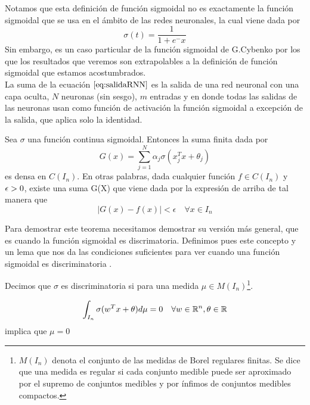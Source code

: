     \noindent Notamos que esta definición de función sigmoidal no es exactamente la función sigmoidal que se usa en el ámbito de las redes neuronales, la cual viene dada por
    \begin{equation}\label{eq:sigmoide}
        \sigma(t) = \frac{1}{1 + e^-x}
    \end{equation}
    \noindent Sin embargo, es un caso particular de la función sigmoidal de G.Cybenko por los que los resultados que veremos son extrapolables a la definición de función sigmoidal que estamos acostumbrados. \\
    
    La suma de la ecuación $\eqref{eq:salidaRNN}$ es la salida de una red neuronal con una capa oculta, $N$ neuronas (sin sesgo), $m$ entradas y en donde todas las salidas de las neuronas usan como función de activación la función sigmoidal a excepción de la salida, que aplica solo la identidad. \\
    
   
   \begin{teorema}\label{teorema:AproximacionUniversal}
   Sea $\sigma$ una función continua sigmoidal. Entonces la suma finita dada por 
   \begin{equation}
       G(x) = \sum_{j=1}^N \alpha_j \sigma(x_j^T x + \theta_j)
   \end{equation}
   \noindent es densa en $C(I_n)$. En otras palabras, dada cualquier función $f \in C(I_n)$ y $\epsilon > 0$, existe una suma G(X) que viene dada por la expresión de arriba de tal manera que 
   \begin{equation}
       |G(x) - f(x)| < \epsilon \quad \forall x \in I_n
   \end{equation}
   \end{teorema}
   
   Para demostrar este teorema necesitamos demostrar su versión más general, que es cuando la función sigmoidal es discrimatoria. Definimos pues este concepto y un lema que nos da las condiciones suficientes para ver cuando una función sigmoidal es discriminatoria . \\
   
    \begin{definicion}
    Decimos que $\sigma$ es discriminatoria si para una medida $\mu \in M(I_n)$\footnote{$M(I_n)$ denota el conjunto de las medidas de Borel regulares finitas. Se dice que una medida es regular si cada conjunto medible puede ser aproximado por el supremo de conjuntos medibles y por ínfimos de conjuntos medibles compactos.}. 
    
    \begin{equation}
        \int_{I_n} \sigma(w^Tx + \theta) d\mu = 0 \quad \forall w\in\mathbb{R}^n, \theta \in \mathbb{R}
    \end{equation}
    \noindent implica que $\mu = 0$
    \end{definicion}
    
